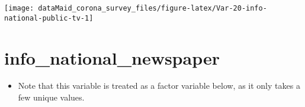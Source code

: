 \documentclass[
]{report}
\providecommand{\tightlist}{%
  \setlength{\itemsep}{0pt}\setlength{\parskip}{0pt}}
\begin{document}
\begin{minipage}{0.25 \textwidth}

\begin{center}\texttt{[image: dataMaid\_corona\_survey\_files/figure-latex/Var-20-info-national-public-tv-1]} \end{center}

\end{minipage}

\noindent\makebox[\linewidth]{\rule{\textwidth}{0.4pt}}

\hypertarget{info_national_newspaper}{%
\section{info\_national\_newspaper}\label{info_national_newspaper}}

\begin{itemize}
\tightlist
\item
  Note that this variable is treated as a factor variable below, as it
  only takes a few unique values.
\end{itemize}
\end{document}
